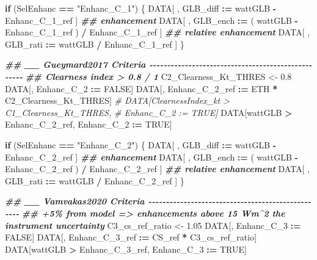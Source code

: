 \documentclass[
  10pt,
  a4paper,oneside]{article}
\newenvironment{Shaded}{\begin{snugshade}}{\end{snugshade}}
\newcommand{\CommentTok}[1]{\textcolor[rgb]{0.56,0.35,0.01}{\textit{#1}}}
\newcommand{\ConstantTok}[1]{\textcolor[rgb]{0.56,0.35,0.01}{#1}}
\newcommand{\ControlFlowTok}[1]{\textcolor[rgb]{0.13,0.29,0.53}{\textbf{#1}}}
\newcommand{\DocumentationTok}[1]{\textcolor[rgb]{0.56,0.35,0.01}{\textbf{\textit{#1}}}}
\newcommand{\FloatTok}[1]{\textcolor[rgb]{0.00,0.00,0.81}{#1}}
\newcommand{\NormalTok}[1]{#1}
\newcommand{\OtherTok}[1]{\textcolor[rgb]{0.56,0.35,0.01}{#1}}
\newcommand{\SpecialCharTok}[1]{\textcolor[rgb]{0.81,0.36,0.00}{\textbf{#1}}}
\newcommand{\StringTok}[1]{\textcolor[rgb]{0.31,0.60,0.02}{#1}}
\begin{document}
\begin{Shaded}
\begin{Highlighting}[]
\ControlFlowTok{if}\NormalTok{ (SelEnhanc }\SpecialCharTok{==} \StringTok{"Enhanc\_C\_1"}\NormalTok{) \{}
\NormalTok{    DATA[ , GLB\_diff }\SpecialCharTok{:=}\NormalTok{   wattGLB }\SpecialCharTok{{-}}\NormalTok{ Enhanc\_C\_1\_ref                    ] }\DocumentationTok{\#\# enhancement}
\NormalTok{    DATA[ , GLB\_ench }\SpecialCharTok{:=}\NormalTok{ ( wattGLB }\SpecialCharTok{{-}}\NormalTok{ Enhanc\_C\_1\_ref ) }\SpecialCharTok{/}\NormalTok{ Enhanc\_C\_1\_ref ] }\DocumentationTok{\#\# relative enhancement}
\NormalTok{    DATA[ , GLB\_rati }\SpecialCharTok{:=}\NormalTok{   wattGLB }\SpecialCharTok{/}\NormalTok{ Enhanc\_C\_1\_ref                    ]}
\NormalTok{\}}


\DocumentationTok{\#\# \_\_ Gueymard2017 Criteria  {-}{-}{-}{-}{-}{-}{-}{-}{-}{-}{-}{-}{-}{-}{-}{-}{-}{-}{-}{-}{-}{-}{-}{-}{-}{-}{-}{-}{-}{-}{-}{-}{-}{-}{-}{-}{-}{-}{-}{-}{-}{-}{-}{-}{-}{-}{-}{-}{-}{-}{-}}
\DocumentationTok{\#\# Clearness index \textgreater{} 0.8 / 1}
\NormalTok{C2\_Clearness\_Kt\_THRES }\OtherTok{\textless{}{-}} \FloatTok{0.8}
\NormalTok{DATA[, Enhanc\_C\_2 }\SpecialCharTok{:=} \ConstantTok{FALSE}\NormalTok{]}
\NormalTok{DATA[, Enhanc\_C\_2\_ref }\SpecialCharTok{:=}\NormalTok{ ETH }\SpecialCharTok{*}\NormalTok{ C2\_Clearness\_Kt\_THRES]}
\CommentTok{\# DATA[ClearnessIndex\_kt \textgreater{} C1\_Clearness\_Kt\_THRES,}
\CommentTok{\#      Enhanc\_C\_2 := TRUE]}
\NormalTok{DATA[wattGLB }\SpecialCharTok{\textgreater{}}\NormalTok{ Enhanc\_C\_2\_ref,}
\NormalTok{     Enhanc\_C\_2 }\SpecialCharTok{:=} \ConstantTok{TRUE}\NormalTok{]}

\ControlFlowTok{if}\NormalTok{ (SelEnhanc }\SpecialCharTok{==} \StringTok{"Enhanc\_C\_2"}\NormalTok{) \{}
\NormalTok{    DATA[ , GLB\_diff }\SpecialCharTok{:=}\NormalTok{   wattGLB }\SpecialCharTok{{-}}\NormalTok{ Enhanc\_C\_2\_ref                    ] }\DocumentationTok{\#\# enhancement}
\NormalTok{    DATA[ , GLB\_ench }\SpecialCharTok{:=}\NormalTok{ ( wattGLB }\SpecialCharTok{{-}}\NormalTok{ Enhanc\_C\_2\_ref ) }\SpecialCharTok{/}\NormalTok{ Enhanc\_C\_2\_ref ] }\DocumentationTok{\#\# relative enhancement}
\NormalTok{    DATA[ , GLB\_rati }\SpecialCharTok{:=}\NormalTok{   wattGLB }\SpecialCharTok{/}\NormalTok{ Enhanc\_C\_2\_ref                    ]}
\NormalTok{\}}



\DocumentationTok{\#\# \_\_ Vamvakas2020  Criteria  {-}{-}{-}{-}{-}{-}{-}{-}{-}{-}{-}{-}{-}{-}{-}{-}{-}{-}{-}{-}{-}{-}{-}{-}{-}{-}{-}{-}{-}{-}{-}{-}{-}{-}{-}{-}{-}{-}{-}{-}{-}{-}{-}{-}{-}{-}{-}{-}{-}{-}}
\DocumentationTok{\#\# +5\% from model =\textgreater{} enhancements above 15 Wm\^{}2 the instrument uncertainty}
\NormalTok{C3\_cs\_ref\_ratio }\OtherTok{\textless{}{-}} \FloatTok{1.05}
\NormalTok{DATA[, Enhanc\_C\_3 }\SpecialCharTok{:=} \ConstantTok{FALSE}\NormalTok{]}
\NormalTok{DATA[, Enhanc\_C\_3\_ref }\SpecialCharTok{:=}\NormalTok{ CS\_ref }\SpecialCharTok{*}\NormalTok{ C3\_cs\_ref\_ratio]}
\NormalTok{DATA[wattGLB }\SpecialCharTok{\textgreater{}}\NormalTok{ Enhanc\_C\_3\_ref,}
\NormalTok{     Enhanc\_C\_3 }\SpecialCharTok{:=} \ConstantTok{TRUE}\NormalTok{]}


\end{Highlighting}
\end{Shaded}
\end{document}
